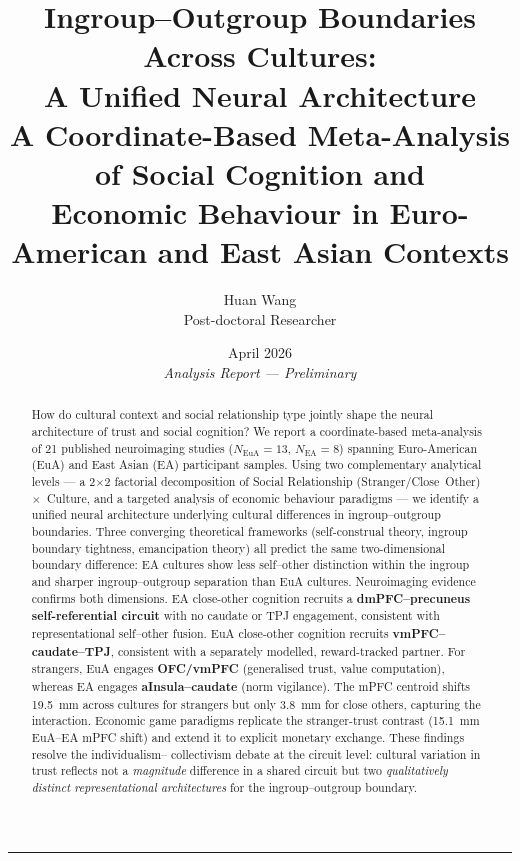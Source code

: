 \documentclass[11pt,a4paper]{article}
\title{\textbf{Ingroup--Outgroup Boundaries Across Cultures:\\
A Unified Neural Architecture}\\[0.6em]
\large\normalfont A Coordinate-Based Meta-Analysis of Social Cognition and\\
Economic Behaviour in Euro-American and East Asian Contexts}
\author{Huan Wang \\ \small Post-doctoral Researcher}
\date{April 2026 \\ \small\textit{Analysis Report — Preliminary}}
\begin{document}
\maketitle
\thispagestyle{fancy}

\begin{abstract}
\noindent
How do cultural context and social relationship type jointly shape the neural architecture of
trust and social cognition? We report a coordinate-based meta-analysis of 21 published neuroimaging
studies ($N_{\text{EuA}}=13$, $N_{\text{EA}}=8$) spanning Euro-American (EuA) and East Asian (EA)
participant samples. Using two complementary analytical levels — a 2$\times$2 factorial decomposition
of Social Relationship (Stranger/Close~Other)~$\times$~Culture, and a targeted analysis of economic
behaviour paradigms — we identify a unified neural architecture underlying cultural differences in
ingroup--outgroup boundaries. Three converging theoretical frameworks (self-construal theory,
ingroup boundary tightness, emancipation theory) all predict the same two-dimensional boundary
difference: EA cultures show less self--other distinction within the ingroup and sharper
ingroup--outgroup separation than EuA cultures. Neuroimaging evidence confirms both dimensions.
EA close-other cognition recruits a \textbf{dmPFC--precuneus self-referential circuit} with no
caudate or TPJ engagement, consistent with representational self--other fusion. EuA close-other
cognition recruits \textbf{vmPFC--caudate--TPJ}, consistent with a separately modelled,
reward-tracked partner. For strangers, EuA engages \textbf{OFC/vmPFC} (generalised trust,
value computation), whereas EA engages \textbf{aInsula--caudate} (norm vigilance). The mPFC
centroid shifts 19.5~mm across cultures for strangers but only 3.8~mm for close others, capturing
the interaction. Economic game paradigms replicate the stranger-trust contrast (15.1~mm EuA--EA
mPFC shift) and extend it to explicit monetary exchange. These findings resolve the individualism--
collectivism debate at the circuit level: cultural variation in trust reflects not a
\emph{magnitude} difference in a shared circuit but two \emph{qualitatively distinct representational
architectures} for the ingroup--outgroup boundary.
\end{abstract}

\tableofcontents
\bigskip\hrule\bigskip

\end{document}
